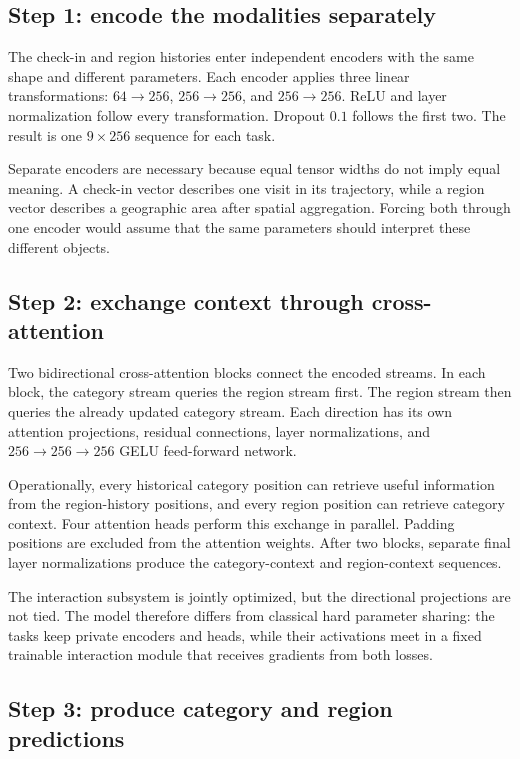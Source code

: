 \subsection{Step 1: encode the modalities separately}

The check-in and region histories enter independent encoders with the same shape
and different parameters. Each encoder applies three linear transformations:
$64\rightarrow256$, $256\rightarrow256$, and $256\rightarrow256$. ReLU and layer
normalization follow every transformation. Dropout $0.1$ follows the first two.
The result is one $9\times256$ sequence for each task.

Separate encoders are necessary because equal tensor widths do not imply equal
meaning. A check-in vector describes one visit in its trajectory, while a region
vector describes a geographic area after spatial aggregation. Forcing both through
one encoder would assume that the same parameters should interpret these different
objects.

\subsection{Step 2: exchange context through cross-attention}

Two bidirectional cross-attention blocks connect the encoded streams. In each
block, the category stream queries the region stream first. The region stream then
queries the already updated category stream. Each direction has its own attention
projections, residual connections, layer normalizations, and
$256\rightarrow256\rightarrow256$ GELU feed-forward network.

Operationally, every historical category position can retrieve useful information
from the region-history positions, and every region position can retrieve category
context. Four attention heads perform this exchange in parallel. Padding positions
are excluded from the attention weights. After two blocks, separate final layer
normalizations produce the category-context and region-context sequences.

The interaction subsystem is jointly optimized, but the directional projections
are not tied. The model therefore differs from classical hard parameter sharing:
the tasks keep private encoders and heads, while their activations meet in a fixed
trainable interaction module that receives gradients from both losses.

\subsection{Step 3: produce category and region predictions}

